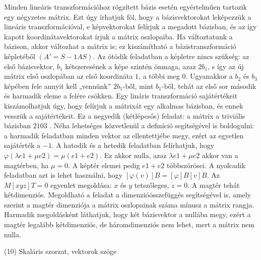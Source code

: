\begin{frame}
  \begin{tcolorbox}[title={9/4. -R-}]
    Minden lineáris transzformációhoz rögzített bázis esetén egyértelműen tartozik egy négyzetes mátrix. Ezt úgy írhatjuk föl, hogy a bázisvektorokat leképezzük a lineáris transzformációval, e képvektorokat felírjuk a megadott bázisban, és az így kapott koordinátavektorokat írjuk a mátrix oszlopaiba. Ha változtatunk a bázison, akkor változhat a mátrix is; ez kiszámítható a bázistranszformáció képletéből $(A' = S-1AS)$. Az ötödik feladatban a képletre nincs szükség: az első bázisvektor, $b_1$ kétszeresének a képe szintén önmaga, azaz $2b_1$, s így az új mátrix első oszlopában az első koordináta $1$, a többi meg $0$. Ugyanakkor a $b_2$ és $b_3$ képében fele annyit kell „vennünk” $2b_1$-ből, mint $b_1$-ből, tehát az első sor második és harmadik eleme a felére csökken. Egy lináris transzformáció sajátértékeit kiszámolhatjuk úgy, hogy felírjuk a mátrixát egy alkalmas bázisban, és ennek vesszük a sajátértékeit. Ez a negyedik (kétlépcsős) feladat: a mátrix a triviális bázisban  $2 1 0 3$ . Néha lehetséges közvetlenül a definíció segítségével is boldogulni: a harmadik feladatban minden vektor az ellentettjébe megy, ezért az egyetlen sajátérték a $-1$. A hatodik és a hetedik feladatban felírhatjuk, hogy ${\varphi}({\lambda}e1 + {\mu}e2) = {\mu}(e1 + e2)$. Ez akkor nulla, azaz ${\lambda}e1 + {\mu}e2$ akkor van a magtérben, ha ${\mu} = 0$. A képtér elemei pedig $e1 + e2$ többszörösei. A nyolcadik feladatban azt is lehet használni, hogy $[{\varphi}(v)]B = [{\varphi}]B[v]B$. Az $M[x y z]T = 0$ egyenlet megoldása: $x$ és $y$ tetszőleges, $z = 0$. A magtér tehát kétdimenziós. Megoldható a feladat a dimenzióösszefüggés segítségével is, amely szerint a magtér dimenziója a mátrix oszlopainak száma mínusz a mátrix rangja. Harmadik megoldásként láthatjuk, hogy két bázisvektor a nullába megy, ezért a magtér legalább kétdimenziós, de háromdimenziós nem lehet, mert a mátrix nem nulla.

  \end{tcolorbox}
\end{frame}


\begin{frame}[plain]
\begin{tcolorbox}[center, colback={myyellow}, coltext={black}, colframe={myyellow}]
    {\RHuge  (10) Skaláris szorzat, vektorok szöge }
    \mmedskip
\end{tcolorbox}
\end{frame}

